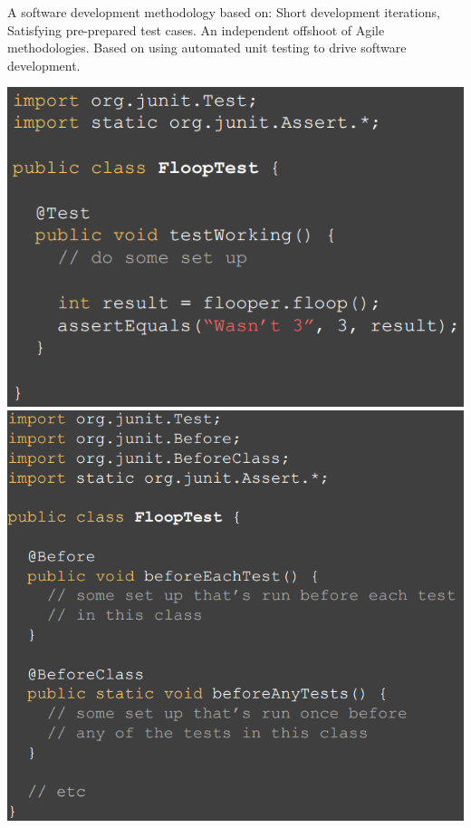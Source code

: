 \documentclass[number]{assignment}
\begin{document}
\begin{landscape}
\begin{multicols}{3}
A software development methodology based on: Short development iterations, Satisfying pre-prepared test cases. An independent offshoot of Agile methodologies. Based on using automated unit testing to drive software development.
\begin{multicols}{2}
\includegraphics[width=\linewidth]{test1.png}
\includegraphics[width=\linewidth]{test2.png}
\end{multicols}
\begin{multicols}{2}

\end{multicols}
\end{multicols}
\end{landscape}
\end{document}
